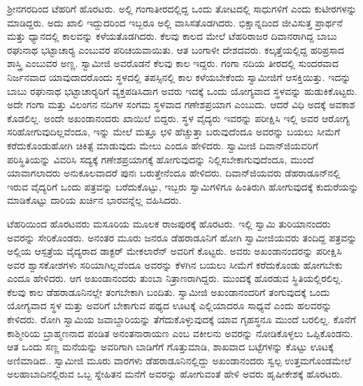 ಶ‍್ರೀನಗರದಿಂದ ಟೆಹರಿಗೆ ಹೊರಟರು. ಅಲ್ಲಿ ಗಂಗಾತೀರದಲ್ಲಿದ್ದ ಒಂದು ತೋಟದಲ್ಲಿ ಸಾಧುಗಳಿಗೆ ಎಂದು ಕುಟೀರಗಳನ್ನು ಮಾಡಿದ್ದರು. ಅದು ಖಾಲಿ ಇದ್ದುದರಿಂದ ಇಬ್ಬರೂ ಅಲ್ಲಿ ವಾಸಿಸತೊಡಗಿದರು. ಭಿಕ್ಷಾನ್ನದಿಂದ ಜೀವಿಸುತ್ತ ಪ್ರಾರ್ಥನೆ ಮತ್ತು ಧ್ಯಾನದಲ್ಲಿ ಕಾಲವನ್ನು ಕಳೆಯತೊಡಗಿದರು. ಕೆಲವು ಕಾಲದ ಮೇಲೆ ಟೆಹರಿರಾಜರ ದಿವಾನರಾಗಿದ್ದ ಬಾಬು ರಘುನಾಥ ಭಟ್ಟಾಚಾರ‍್ಯ ಎಂಬುವರ ಪರಿಚಯವಾಯಿತು. ಆತ ಬಂಗಾಳೀ ದೇಶದವರು. ಕಲ್ಕತ್ತೆಯಲ್ಲಿದ್ದ ಹರಿಪ್ರಸಾದ ಶಾಸ್ತ್ರಿ ಎಂಬುವರ ಅಣ್ಣ. ಸ್ವಾಮೀಜಿ ಅವರೊಡನೆ ಕೆಲವು ಕಾಲ ಇದ್ದರು. ಗಂಗಾ ನದಿಯ ತೀರದಲ್ಲಿ ಸುಂದರವಾದ ನಿರ್ಜನವಾದ ಯಾವುದಾದರೊಂದು ಸ್ಥಳದಲ್ಲಿ ತಪಸ್ಸಿನಲ್ಲಿ ಕಾಲ ಕಳೆಯಬೇಕೆಂದು ಸ್ವಾಮೀಜಿಗೆ ಆಸಕ್ತಿಯಿತ್ತು. ಇದನ್ನು ಬಾಬು ರಘುನಾಥ ಭಟ್ಟಾಚಾರ‍್ಯರಿಗೆ ವ್ಯಕ್ತಪಡಿಸಿದಾಗ ಅವರು ಇದಕ್ಕೆ ಒಂದು ಯೋಗ್ಯವಾದ ಸ್ಥಳವನ್ನು ಹುಡುಕಿಕೊಟ್ಟರು. ಅದೇ ಗಂಗಾ ಮತ್ತು ವಿಲಂಗನ ನದಿಗಳ ಸಂಗಮ ಸ್ಥಳವಾದ ಗಣೇಶಪ್ರಯಾಗ ಎಂಬುದು. ಆದರೆ ವಿಧಿ ಅದಕ್ಕೆ ಅವಕಾಶ ಕೊಡಲಿಲ್ಲ. ಅಂದೇ ಅಖಂಡಾನಂದರು ಖಾಯಿಲೆ ಬಿದ್ದರು. ಸ್ಥಳ ವೈದ್ಯರು ಇವರನ್ನು ಪರೀಕ್ಷಿಸಿ ಇಲ್ಲಿ ಅವರ ಆರೋಗ್ಯ ಸರಿಹೋಗುವುದಿಲ್ಲವೆಂದೂ, ಇನ್ನು ಮೇಲೆ ಮತ್ತೂ ಛಳಿ ಹೆಚ್ಚುತ್ತಾ ಬರುವುದೆಂದೂ ಅವರನ್ನು ಬಯಲು ಸೀಮೆಗೆ ಕರೆದುಕೊಂಡುಹೋಗಿ ಚಿಕಿತ್ಸೆ ಮಾಡುವುದು ಮೇಲು ಎಂದೂ ಹೇಳಿದರು. ಸ್ವಾಮೀಜಿ ದಿವಾನ್‍ಜಿಯವರಿಗೆ ಪರಿಸ್ಥಿತಿಯನ್ನು ವಿವರಿಸಿ ಸದ್ಯಕ್ಕೆ ಗಣೇಶಪ್ರಯಾಗಕ್ಕೆ ಹೋಗುವುದನ್ನು ನಿಲ್ಲಿಸಬೇಕಾಗುವುದೆಂದೂ, ಮುಂದೆ ಯಾವಾಗಲಾದರು ಅನುಕೂಲವಾದರೆ ಪುನಃ ಬರುತ್ತೇನೆಂದೂ ಹೇಳಿದರು. ದಿವಾನ್‍ಜಿಯವರು ಡೆಹರಾಡೂನ್‍ನಲ್ಲಿ ಇರುವ ವೈದ್ಯರಿಗೆ ಒಂದು ಪತ್ರವನ್ನು ಬರೆದುಕೊಟ್ಟು, ಇಬ್ಬರು ಸ್ವಾಮಿಗಳಿಗೂ ಹಿಂತಿರುಗಿ ಹೋಗುವುದಕ್ಕೆ ಕುದುರೆಯನ್ನು ಮಾಡಿಕೊಟ್ಟು ದಾರಿಯ ಖರ್ಚಿನ ಭಾರವನ್ನೆಲ್ಲ ವಹಿಸಿದರು. 

ಟೆಹರಿಯಿಂದ ಹೊರಟವರು ಮಸೂರಿಯ ಮೂಲಕ ರಾಜಪುರಕ್ಕೆ ಹೊರಟರು. ಇಲ್ಲಿ ಸ್ವಾಮಿ ತುರಿಯಾನಂದರು ಅವರನ್ನು ಸೇರಿಕೊಂಡರು. ಅನಂತರ ಮೂರು ಜನರೂ ಡೆಹರಾಡೂನಿಗೆ ಹೋಗಿ ಸ್ವಾಮೀಜಿಯವರು ತಂದಿದ್ದ ಪತ್ರವನ್ನು ಅಲ್ಲಿಯ ಆಸ್ಪತ್ರೆಯ ವೈದ್ಯರಾದ ಡಾಕ್ಟರ್ ಮೇಕಲಾರೆನ್ ಅವರಿಗೆ ಕೊಟ್ಟರು. ಅವರು ಅಖಂಡಾನಂದರನ್ನು ಪರೀಕ್ಷಿಸಿ ಅವರ ಶ್ವಾಸಕೋಶಗಳು ಸರಿಯಾಗಿಲ್ಲವೆಂದೂ ಅವರನ್ನು ಕೆಳಗಿನ ಬಯಲು ಸೀಮೆಗೆ ಕರೆದುಕೊಂಡು ಹೋಗಬೇಕು ಎಂದೂ ಹೇಳಿದರು. ಆಗ ಅಖಂಡಾನಂದರು ತುಂಬಾ ನಿತ್ರಾಣರಾಗಿದ್ದರು. ಮುಂದಕ್ಕೆ ಹೊರಡುವ ಸ್ಥಿತಿಯಲ್ಲಿರಲಿಲ್ಲ. ಕೆಲವು ಕಾಲ ಡೆಹರಾಡೂನಿನಲ್ಲೇ ತಂಗಬೇಕಾಗಿ ಬಂದಿತು. ಸ್ವಾಮೀಜಿ ಅಖಂಡಾನಂದರಿಗೆ ತಂಗುವುದಕ್ಕೆ ಒಂದು ಯೋಗ್ಯವಾದ ಸ್ಥಳ ಮತ್ತು ಅವರಿಗೆ ಬೇಕಾಗುವ ಪಥ್ಯದ ಊಟಕ್ಕೆ ಎಲ್ಲಿಯಾದರೂ ಸಾಧ್ಯವೆ ಎಂದು ಹಲವರನ್ನು ಕೇಳಿದರು. ರೋಗಿ ಸ್ವಾಮಿಯ ಜವಾಬ್ದಾರಿಯನ್ನು ತೆಗೆದುಕೊಳ್ಳುವುದಕ್ಕೆ ಯಾವ ಗೃಹಸ್ಥನೂ ಮುಂದೆ ಬರಲಿಲ್ಲ. ಕೊನೆಗೆ ಕಾಶ್ಮೀರಿಯ ಬ್ರಾಹ್ಮಣನಾದ ಪಂಡಿತ ಅನಂತನಾರಾಯಣ ಎಂಬ ವಕೀಲನು ಅವರನ್ನು ನೋಡಿಕೊಳ್ಳಲು ಒಪ್ಪಿಕೊಂಡನು. ಆತ ಒಂದು ಸಣ್ಣ ಮನೆಯನ್ನು ಅವರಿಗಾಗಿ ಬಾಡಿಗೆಗೆ ಗೊತ್ತುಮಾಡಿ, ಶಾಖವಾದ ಬಟ್ಟೆಗಳನ್ನು ಕೊಟ್ಟು ಊಟಕ್ಕೆ ಅಣಿಮಾಡಿದ.. ಸ್ವಾಮೀಜಿ ಮೂರು ವಾರಗಳು ಡೆಹರಾಡೂನಿನಲ್ಲಿದ್ದು ಅಖಂಡಾನಂದರು ಸ್ವಲ್ಪ ಉತ್ತಮಗೊಂಡಮೇಲೆ ಅಲಹಾಬಾದಿನಲ್ಲಿರುವ ಒಬ್ಬ ಸ್ನೇಹಿತನ ಮನೆಗೆ ಅವರನ್ನು ಹೋಗುವಂತೆ ಹೇಳಿ ಅವರು ಹೃಷೀಕೇಶಕ್ಕೆ ಹೊರಟರು. 

